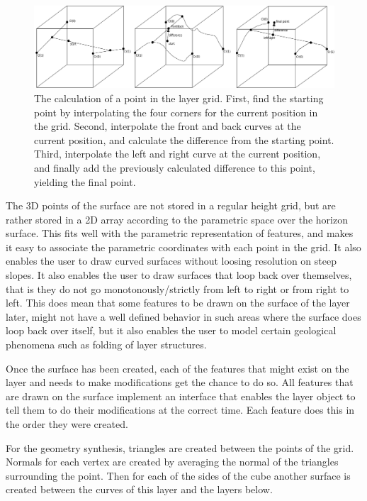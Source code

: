 \documentclass[a4paper,12pt]{report}
\begin{document}
\begin{figure}
 \label{fig:layerCreation}
 \includegraphics[width=\linewidth]{thesis/layerCreation.pdf}
 \caption{The calculation of a point in the layer grid. First, find the starting point by interpolating the four corners for the current position in the grid. Second, interpolate the front and back curves at the current position, and calculate the difference from the starting point. Third, interpolate the left and right curve at the current position, and finally add the previously calculated difference to this point, yielding the final point.}
\end{figure}

The 3D points of the surface are not stored in a regular height grid, but are rather stored in a 2D array according to the parametric space over the horizon surface. This fits well with the parametric representation of features, and makes it easy to associate the parametric coordinates with each point in the grid. It also enables the user to draw curved surfaces without loosing resolution on steep slopes. It also enables the user to draw surfaces that loop back over themselves, that is they do not go monotonously/strictly from left to right or from right to left. This does mean that some features to be drawn on the surface of the layer later, might not have a well defined behavior in such areas where the surface does loop back over itself, but it also enables the user to model certain geological phenomena such as folding of layer structures.

Once the surface has been created, each of the features that might exist on the layer and needs to make modifications get the chance to do so. All features that are drawn on the surface implement an interface that enables the layer object to tell them to do their modifications at the correct time. Each feature does this in the order they were created.

For the geometry synthesis, triangles are created between the points of the grid. Normals for each vertex are created by averaging the normal of the triangles surrounding the point. Then for each of the sides of the cube another surface is created between the curves of this layer and the layers below.
\end{document}
